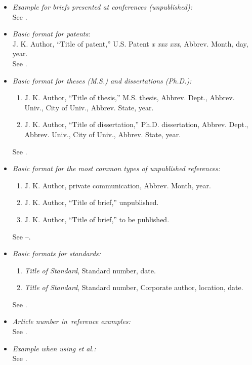 \documentclass{IEEEtran}
\begin{document}
\begin{itemize}
\item \emph{Example for briefs presented at conferences (unpublished):}\\
See \cite{b23}.

\item \emph{Basic format for patents}$:$\\
J. K. Author, ``Title of patent,'' U.S. Patent \emph{x xxx xxx}, Abbrev. Month, day, year.\\
See \cite{b24}.

\item \emph{Basic format for theses (M.S.) and dissertations (Ph.D.):}
\begin{enumerate}
\item J. K. Author, ``Title of thesis,'' M.S. thesis, Abbrev. Dept., Abbrev. Univ., City of Univ., Abbrev. State, year.
\item J. K. Author, ``Title of dissertation,'' Ph.D. dissertation, Abbrev. Dept., Abbrev. Univ., City of Univ., Abbrev. State, year.
\end{enumerate}
See \cite{b25,b26}.

\item \emph{Basic format for the most common types of unpublished references:}
\begin{enumerate}
\item J. K. Author, private communication, Abbrev. Month, year.
\item J. K. Author, ``Title of brief,'' unpublished.
\item J. K. Author, ``Title of brief,'' to be published.
\end{enumerate}
See \cite{b27}--\cite{b29}.

\item \emph{Basic formats for standards:}
\begin{enumerate}
\item \emph{Title of Standard}, Standard number, date.
\item \emph{Title of Standard}, Standard number, Corporate author, location, date.
\end{enumerate}
See \cite{b30,b31}.

\item \emph{Article number in~reference examples:}\\
See \cite{b32,b33}.

\item \emph{Example when using et al.:}\\
See \cite{b34}.

\end{itemize}
\end{document}

